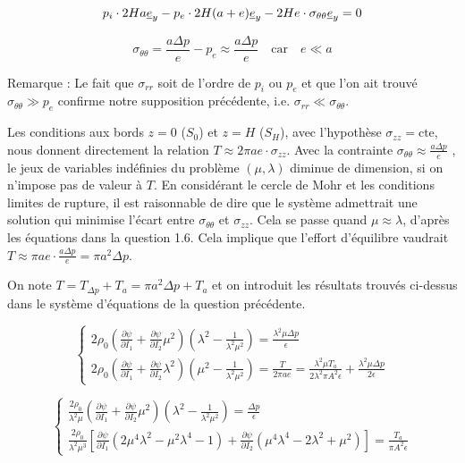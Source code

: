 \documentclass[a4paper,11pt]{article}
\newcommand{\FRAC}{\displaystyle\frac}
\newcommand{\verseur}[1]{\uline{e}_{#1}}
\begin{document}
$$p_i \cdot 2Ha \verseur{y} - p_e \cdot 2H (a+e) \verseur{y} - 2He \cdot \sigma_{\theta\theta} \verseur{y} = 0$$

$$\sigma_{\theta\theta} = \frac{a\Delta p}{e} - p_e \approx  \frac{a\Delta p}{e} \quad\mathrm{car }\quad e \ll a$$

Remarque : Le fait que $\sigma_{rr}$ soit de l'ordre de $p_i$ ou $p_e$ et que l'on ait trouvé $\sigma_{\theta\theta} \gg p_e$ confirme notre supposition précédente, i.e. $\sigma_{rr} \ll \sigma_{\theta\theta}$.

Les conditions aux bords $z=0$ ($S_0$) et $z=H$ ($S_H$), avec l'hypothèse $\sigma_{zz} = \mathrm{cte}$, nous donnent directement la relation $T \approx 2\pi a e \cdot \sigma_{zz}$. Avec la contrainte $\sigma_{\theta\theta} \approx \frac{a\Delta p}{e}$ , le jeux de variables indéfinies du problème $(\mu, \lambda)$ diminue de dimension, si on n'impose pas de valeur à $T$. En considérant le cercle de Mohr et les conditions limites de rupture, il est raisonnable de dire que le système admettrait une solution qui minimise l'écart entre $\sigma_{\theta\theta}$ et $\sigma_{zz}$. Cela se passe quand $\mu \approx \lambda$, d'après les équations dans la question 1.6. Cela implique que l'effort d'équilibre vaudrait $T \approx \pi ae \cdot \frac{a\Delta p}{e} = \pi a^2 \Delta p$.

On note $T = T_{\Delta p} + T_a = \pi a^2 \Delta p + T_a$ et on introduit les résultats trouvés ci-dessus dans le système d'équations de la question précédente.

$$
\begin{cases}
2\rho_0 \left (\frac{\partial\psi}{\partial I_1} + \frac{\partial\psi}{\partial I_2} \mu^2 \right) \left ( \lambda^2 - \frac{1}{\lambda^2\mu^2} \right) = \frac{\lambda^2\mu \Delta p}{\epsilon} \\
2\rho_0 \left (\frac{\partial\psi}{\partial I_1} + \frac{\partial\psi}{\partial I_2} \lambda^2 \right) \left ( \mu^2 - \frac{1}{\lambda^2\mu^2} \right) = \frac{T}{2\pi ae} = \frac{\lambda^2\mu T_a}{2\lambda^2\pi A^2 \epsilon } + \frac{\lambda^2\mu\Delta p}{2\epsilon}
\end{cases}
$$

$$
\begin{cases}
\FRAC{2\rho_0}{\lambda^2\mu} \left (\FRAC{\partial\psi}{\partial I_1} + \FRAC{\partial\psi}{\partial I_2} \mu^2 \right) \left ( \lambda^2 - \FRAC{1}{\lambda^2\mu^2} \right) = \FRAC{\Delta p}{\epsilon} \\
\FRAC{2\rho_0}{\lambda^2\mu^3} \left [\FRAC{\partial\psi}{\partial I_1} (2\mu^4\lambda^2-\mu^2\lambda^4-1) + \FRAC{\partial\psi}{\partial I_2} (\mu^4 \lambda^4 - 2\lambda^2 + \mu^2) \right] = \FRAC{T_a}{\pi A^2 \epsilon}
\end{cases}
$$
\end{document}
